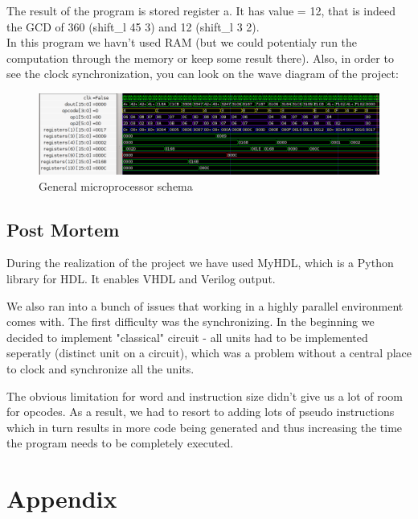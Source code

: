\documentclass[12pt,a4paper]{scrartcl}
\begin{document}
The result of the program is stored register a. It has value = 12, that is indeed the GCD of 360 (shift\_l 45 3) and 12 (shift\_l 3 2).\\
In this program we havn't used RAM (but we could potentialy run the computation through the memory or keep some result there).
Also, in order to see the clock synchronization, you can look on the wave diagram of the project:

\begin{figure}[h]
	\includegraphics[scale=0.7,center]{pics/gtkwave.png}
	\caption{General microprocessor schema}
\end{figure}

\newpage
\subsection{Post Mortem}
During the realization of the project we have used MyHDL, which is a Python library for HDL. It enables VHDL and Verilog output.

We also ran into a bunch of issues that working in a highly parallel environment comes with.
The first difficulty was the synchronizing. In the beginning we decided to implement "classical" circuit - all units had to be implemented seperatly (distinct unit on a circuit), which was a problem without a central place to clock and synchronize all the units.

The obvious limitation for word and instruction size didn't give us a lot of room for opcodes. As a result, we had to resort to adding lots of pseudo instructions which in turn results in more code being generated and thus increasing the time the program needs to be completely executed. 

\newpage
\section{Appendix}
\end{document}
